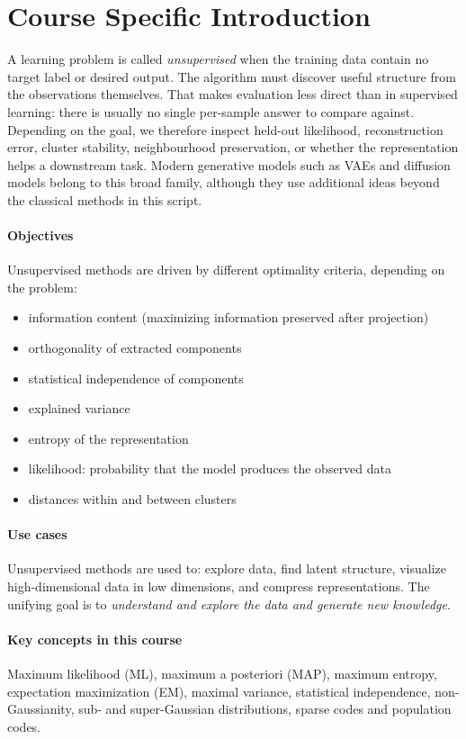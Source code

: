 \documentclass[11pt, oneside]{book}
\begin{document}
\section{Course Specific Introduction}

A learning problem is called \emph{unsupervised} when the training data contain no
target label or desired output. The algorithm must discover useful structure from the
observations themselves. That makes evaluation less direct than in supervised learning:
there is usually no single per-sample answer to compare against. Depending on the goal,
we therefore inspect held-out likelihood, reconstruction error, cluster stability,
neighbourhood preservation, or whether the representation helps a downstream task.
Modern generative models such as VAEs and diffusion models belong to this broad family,
although they use additional ideas beyond the classical methods in this script.

\paragraph{Objectives} Unsupervised methods are driven by different optimality criteria,
depending on the problem:
\begin{itemize}
  \item information content (maximizing information preserved after projection)
  \item orthogonality of extracted components
  \item statistical independence of components
  \item explained variance
  \item entropy of the representation
  \item likelihood: probability that the model produces the observed data
  \item distances within and between clusters
\end{itemize}

\paragraph{Use cases} Unsupervised methods are used to:
explore data, find latent structure, visualize high-dimensional data in low dimensions,
and compress representations.
The unifying goal is to \emph{understand and explore the data and generate new knowledge}.

\paragraph{Key concepts in this course}
Maximum likelihood (ML), maximum a posteriori (MAP), maximum entropy, expectation
maximization (EM), maximal variance, statistical independence, non-Gaussianity,
sub- and super-Gaussian distributions, sparse codes and population codes.
\end{document}
